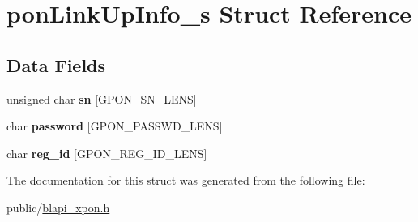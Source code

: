 \hypertarget{structponLinkUpInfo__s}{}\section{pon\+Link\+Up\+Info\+\_\+s Struct Reference}
\label{structponLinkUpInfo__s}
\subsection*{Data Fields}
\begin{DoxyCompactItemize}
\item 
\mbox{\label{structponLinkUpInfo__s_a7389a4eda90ab1e6d242ca1fd8deb9c1}} 
unsigned char {\bfseries sn} \mbox{[}G\+P\+O\+N\+\_\+\+S\+N\+\_\+\+L\+E\+NS\mbox{]}
\item 
\mbox{\label{structponLinkUpInfo__s_aded03751c6a1ae5382216b70c7251d64}} 
char {\bfseries password} \mbox{[}G\+P\+O\+N\+\_\+\+P\+A\+S\+S\+W\+D\+\_\+\+L\+E\+NS\mbox{]}
\item 
\mbox{\label{structponLinkUpInfo__s_a36cdacaa674acf3f57c422ae79222f27}} 
char {\bfseries reg\+\_\+id} \mbox{[}G\+P\+O\+N\+\_\+\+R\+E\+G\+\_\+\+I\+D\+\_\+\+L\+E\+NS\mbox{]}
\end{DoxyCompactItemize}


The documentation for this struct was generated from the following file\+:\begin{DoxyCompactItemize}
\item 
public/\hyperlink{blapi__xpon_8h}{blapi\+\_\+xpon.\+h}\end{DoxyCompactItemize}
